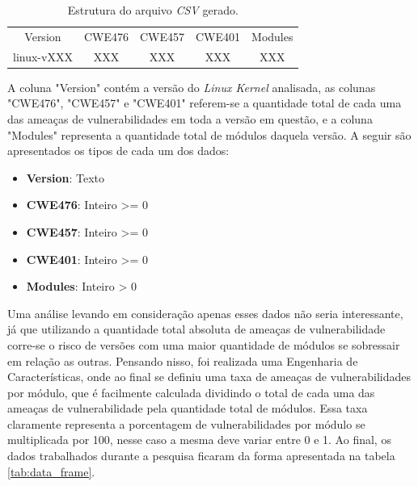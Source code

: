 \begin{table}[h]
\centering
\begin{tabular}{ccccc}
\rowcolor[HTML]{EFEFEF} 
{ Version} & { CWE476} & { CWE457} & { CWE401} & { Modules} \\
linux-vXXX    & XXX          & XXX          & XXX          & XXX          
\end{tabular}
\caption{Estrutura do arquivo \textit{CSV} gerado.}
\label{tab:csv}
\end{table}

A coluna "Version" contém a versão do \textit{Linux Kernel} analisada, as
colunas "CWE476", "CWE457" e "CWE401" referem-se a quantidade total de cada uma
das ameaças de vulnerabilidades em toda a versão em questão, e a coluna
"Modules" representa a quantidade total de módulos daquela versão. A seguir são
apresentados os tipos de cada um dos dados:

\begin{itemize}
  \item \textbf{Version}: Texto
  \item \textbf{CWE476}: Inteiro >= 0
  \item \textbf{CWE457}: Inteiro >= 0
  \item \textbf{CWE401}: Inteiro >= 0
  \item \textbf{Modules}: Inteiro > 0
\end{itemize}

Uma análise levando em consideração apenas esses dados não seria interessante,
já que utilizando a quantidade total absoluta de ameaças de vulnerabilidade
corre-se o risco de versões com uma maior quantidade de módulos se sobressair
em relação as outras. Pensando nisso, foi realizada uma Engenharia de
Características, onde ao final se definiu uma taxa de ameaças de
vulnerabilidades por módulo, que é facilmente calculada dividindo o total de
cada uma das ameaças de vulnerabilidade pela quantidade total de módulos. Essa
taxa claramente representa a porcentagem de vulnerabilidades por módulo se
multiplicada por 100, nesse caso a mesma deve variar entre 0 e 1. Ao final, os
dados trabalhados durante a pesquisa ficaram da forma apresentada na
tabela \ref{tab:data_frame}.

\begin{table}[h]
\centering
{}
\caption{Estrutura de dados após Engenharia de Características.}
\label{tab:data_frame}
\end{table}

